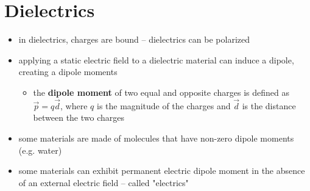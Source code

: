 \documentclass[10pt]{article}
\begin{document}
\section{Dielectrics}
\begin{itemize}
    \item in dielectrics, charges are bound -- dielectrics can be polarized
    \item applying a static electric field to a dielectric material can induce a dipole, creating a dipole moments
        \begin{itemize}
            \item the \textbf{dipole moment} of two equal and opposite charges is defined as $\vec{p} = q \vec{d}$, where $q$ is the magnitude of the charges and $ \vec{d}$ is the distance between the two charges
        \end{itemize}
    \item some materials are made of molecules that have non-zero dipole moments (e.g. water)
    \item some materials can exhibit permanent electric dipole moment in the absence of an external electric field -- called "electrics"
\end{itemize}
\end{document}

